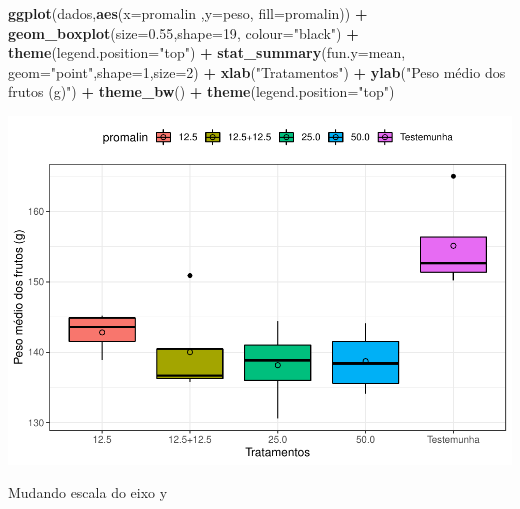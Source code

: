 \documentclass[]{book}
\newenvironment{Shaded}{\begin{snugshade}}{\end{snugshade}}
\newcommand{\DataTypeTok}[1]{\textcolor[rgb]{0.13,0.29,0.53}{#1}}
\newcommand{\DecValTok}[1]{\textcolor[rgb]{0.00,0.00,0.81}{#1}}
\newcommand{\FloatTok}[1]{\textcolor[rgb]{0.00,0.00,0.81}{#1}}
\newcommand{\KeywordTok}[1]{\textcolor[rgb]{0.13,0.29,0.53}{\textbf{#1}}}
\newcommand{\NormalTok}[1]{#1}
\newcommand{\OperatorTok}[1]{\textcolor[rgb]{0.81,0.36,0.00}{\textbf{#1}}}
\newcommand{\StringTok}[1]{\textcolor[rgb]{0.31,0.60,0.02}{#1}}
\begin{document}
\begin{Shaded}
\begin{Highlighting}[]
\KeywordTok{ggplot}\NormalTok{(dados,}\KeywordTok{aes}\NormalTok{(}\DataTypeTok{x=}\NormalTok{promalin ,}\DataTypeTok{y=}\NormalTok{peso, }\DataTypeTok{fill=}\NormalTok{promalin)) }\OperatorTok{+}\StringTok{ }
\StringTok{      }\KeywordTok{geom_boxplot}\NormalTok{(}\DataTypeTok{size=}\FloatTok{0.55}\NormalTok{,}\DataTypeTok{shape=}\DecValTok{19}\NormalTok{, }\DataTypeTok{colour=}\StringTok{"black"}\NormalTok{) }\OperatorTok{+}\StringTok{ }
\StringTok{      }\KeywordTok{theme}\NormalTok{(}\DataTypeTok{legend.position=}\StringTok{"top"}\NormalTok{) }\OperatorTok{+}\StringTok{ }
\StringTok{      }\KeywordTok{stat_summary}\NormalTok{(}\DataTypeTok{fun.y=}\NormalTok{mean, }\DataTypeTok{geom=}\StringTok{"point"}\NormalTok{,}\DataTypeTok{shape=}\DecValTok{1}\NormalTok{,}\DataTypeTok{size=}\DecValTok{2}\NormalTok{) }\OperatorTok{+}\StringTok{ }
\StringTok{      }\KeywordTok{xlab}\NormalTok{(}\StringTok{"Tratamentos"}\NormalTok{) }\OperatorTok{+}\StringTok{  }
\StringTok{      }\KeywordTok{ylab}\NormalTok{(}\StringTok{"Peso médio dos frutos (g)"}\NormalTok{)  }\OperatorTok{+}
\StringTok{      }\KeywordTok{theme_bw}\NormalTok{() }\OperatorTok{+}
\StringTok{      }\KeywordTok{theme}\NormalTok{(}\DataTypeTok{legend.position=}\StringTok{"top"}\NormalTok{) }
\end{Highlighting}
\end{Shaded}

\includegraphics{TudodoR_files/figure-latex/unnamed-chunk-238-1.pdf}

Mudando escala do eixo y
\end{document}
